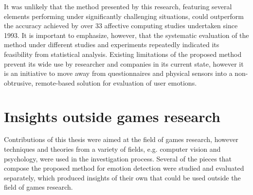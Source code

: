 It was unlikely that the method presented by this research, featuring several elements performing under significantly challenging situations, could outperform the accuracy achieved by over 33 affective computing studies undertaken since 1993. It is important to emphasize, however, that the systematic evaluation of the method under different studies and experiments repeatedly indicated its feasibility from statistical analysis. Existing limitations of the proposed method prevent its wide use by researcher and companies in its current state, however it is an initiative to move away from questionnaires and physical sensors into a non-obtrusive, remote-based solution for evaluation of user emotions.





\section{Insights outside games research}

Contributions of this thesis were aimed at the field of games research, however techniques and theories from a variety of fields, e.g. computer vision and psychology, were used in the investigation process. Several of the pieces that compose the proposed method for emotion detection were studied and evaluated separately, which produced insights of their own that could be used outside the field of games research.

